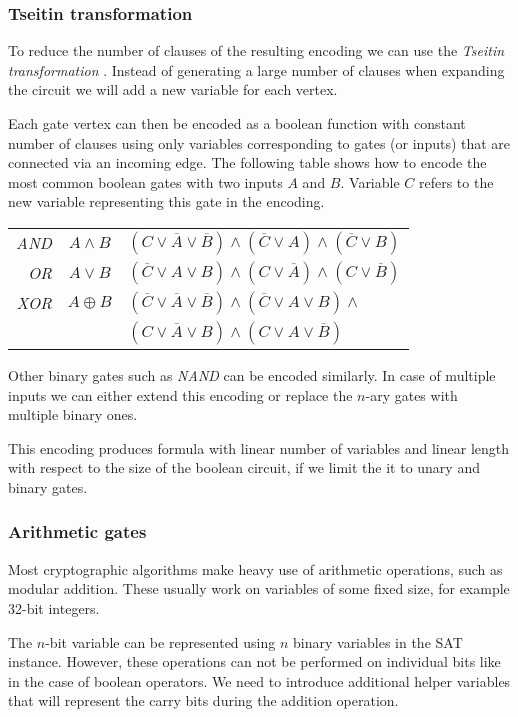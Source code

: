 \subsubsection{Tseitin transformation}
\label{sec:tseitin}
To reduce the number of clauses of the resulting encoding we can use the \emph{Tseitin transformation} \cite{tseitin1983complexity}.
Instead of generating a large number of clauses when expanding the circuit we will add a new variable for each vertex.

Each gate vertex can then be encoded as a boolean function with constant number of clauses using only variables corresponding to gates (or inputs) that are connected via an incoming edge.
The following table shows how to encode the most common boolean gates with two inputs $A$ and $B$.
Variable $C$ refers to the new variable representing this gate in the encoding.

\begin{tabular}{r c l}
\emph{AND}& $A\land B$ & $(C \lor \overline{A} \lor \overline{B}) \land (\overline{C} \lor A) \land (\overline{C} \lor B)$ \\
\emph{OR} & $A\lor B$ & $(\overline{C} \lor A \lor B) \land (C \lor \overline{A}) \land (C \lor \overline{B})$ \\
\emph{XOR} & $A\oplus B$ & $(\overline{C} \lor \overline{A} \lor \overline{B}) \land (\overline{C} \lor A \lor B) \land$\\
& & $(C \lor \overline{A} \lor B) \land (C \lor A \lor \overline{B})$
\end{tabular}

Other binary gates such as \emph{NAND} can be encoded similarly.
In case of multiple inputs we can either extend this encoding or replace the $n$-ary gates with multiple binary ones.

This encoding produces formula with linear number of variables and linear length with respect to the size of the boolean circuit, if we limit the it to unary and binary gates.

\subsubsection{Arithmetic gates}
Most cryptographic algorithms make heavy use of arithmetic operations, such as modular addition.
These usually work on variables of some fixed size, for example 32-bit integers.

The $n$-bit variable can be represented using $n$ binary variables in the SAT instance.
However, these operations can not be performed on individual bits like in the case of boolean operators.
We need to introduce additional helper variables that will represent the carry bits during the addition operation.


